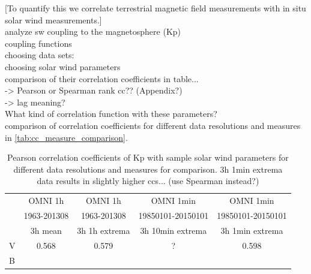 [To quantify this we correlate terrestrial magnetic field measurements with in situ solar wind measurements.]\\


analyze sw coupling to the magnetosphere (Kp)\\
coupling functions\\

choosing data sets:\\

choosing solar wind parameters\\
	comparison of their correlation coefficients in table...\\
		-> Pearson or Spearman rank cc?? (Appendix?)\\
		-> lag meaning?\\
	
What kind of correlation function with these parameters?\\


comparison of correlation coefficients for different data resolutions and measures in \autoref{tab:cc_measure_comparison}.
\begin{table}[htb]\small
	\centering
	\captionsetup{belowskip=4pt}
	\caption{Pearson correlation coefficients of Kp with sample solar wind parameters for different data resolutions and measures for comparison. 3h 1min extrema data results in slightly higher ccs... (use Spearman instead?)}
	\begin{tabular}{lcccc}
		\toprule
			&OMNI 1h	&OMNI 1h	&OMNI 1min	&OMNI 1min\\
			&1963-201308	&1963-201308	&19850101-20150101	&19850101-20150101\\
			&3h mean	&3h 1h extrema	&3h 10min extrema	&3h 1min extrema\\
		\midrule
		V	&0.568	&0.579	&?	&0.598\\
		B	&	&	&	&\\
		\bottomrule
	\end{tabular}
	\label{tab:cc_measure_comparison}
\end{table}


